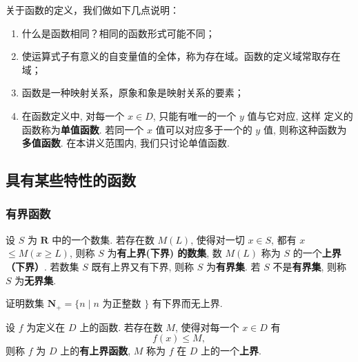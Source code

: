 

关于函数的定义，我们做如下几点说明：

\begin{enumerate}
    \item 什么是函数相同？相同的函数形式可能不同；
    \item 使运算式子有意义的自变量值的全体，称为存在域。函数的定义域常取存在域；
    \item 函数是一种映射关系，原象和象是映射关系的要素；
    \item 在函数定义中, 对每一个 $x \in D$, 只能有唯一的一个 $y$ 值与它对应, 这样 定义的函数称为\textcolor{third}{\bf 单值函数}. 若同一个 $x$ 值可以对应多于一个的 $y$ 值, 则称这种函数为\textcolor{third}{\bf 多值函数}. 在本讲义范围内, 我们只讨论单值函数.
\end{enumerate}

\subsection{具有某些特性的函数}

\subsubsection{有界函数}

\begin{definition}[有界集]
    设 $S$ 为 $\mathbf{R}$ 中的一个数集. 若存在数 $M(L)$, 使得对一切 $x \in S$, 都有 $x$ $\leqslant M(x \geqslant L)$, 则称 $S$ 为\textcolor{third}{\bf 有上界(下界) 的数集}, 数 $M(L)$ 称为 $S$ 的一个\textcolor{third}{\bf 上界（下界）}.
    若数集 $S$ 既有上界又有下界, 则称 $S$ 为\textcolor{third}{\bf 有界集}. 若 $S$ 不是\textcolor{third}{\bf 有界集}, 则称 $S$ 为\textcolor{third}{\bf 无界集}.
\end{definition}

\begin{exercise}
    证明数集 $\mathbf{N}_{+}=\{n \mid n$ 为正整数 $\}$ 有下界而无上界.
\end{exercise}

\begin{definition}[有上界函数]
    设 $f$ 为定义在 $D$ 上的函数. 若存在数 $M$, 使得对每一个 $x \in D$ 有
    $$
    f(x) \leqslant M,
    $$
    则称 $f$ 为 $D$ 上的\textcolor{third}{\bf 有上界函数}, $M$ 称为 $f$ 在 $D$ 上的一个\textcolor{third}{\bf 上界}.
\end{definition}

